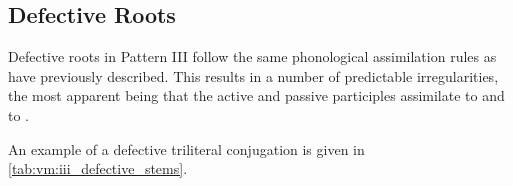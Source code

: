 \documentclass[grammar]{subfiles}
\begin{document}
\subsection{Defective Roots}
\label{ssec:vm:iii_defective_roots}

Defective roots in Pattern III follow the same phonological assimilation rules
as have previously described.  This results in a number of predictable
irregularities, the most apparent being that the active and passive participles
assimilate  to  and  to .

An example of a defective triliteral conjugation is given in \cref{tab:vm:iii_defective_stems}. 

\begin{table}[h!]\small\capstart
  \centering
  \\
  \caption{Pattern III defective stems \label{tab:vm:iii_defective_stems}}
\end{table}
\end{document}
